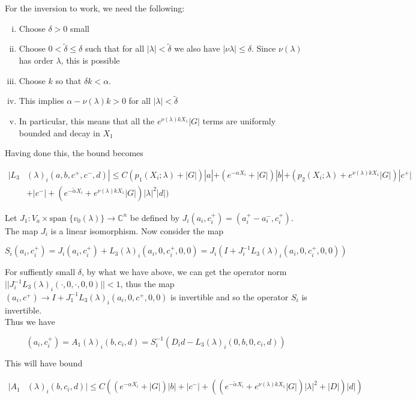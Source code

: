 \documentclass[12pt]{article}
\def\C{{\mathbb C}}
\begin{document}
\begin{enumerate}
For the inversion to work, we need the following:

\begin{enumerate}[(i)]
\item Choose $\delta > 0$ small
\item Choose $0 < \tilde{\delta} \leq \delta$ such that for all $|\lambda| < \tilde{\delta}$ we also have $|\nu{\lambda}| \leq \delta$. Since $\nu(\lambda)$ has order $\lambda$, this is possible
\item Choose $k$ so that $\delta k < \alpha$. 
\item This implies $\alpha - \nu(\lambda) k > 0$ for all $|\lambda| < \tilde{\delta}$
\item In particular, this means that all the $e^{\nu(\lambda)k X_1} |G|$ terms are uniformly bounded and decay in $X_1$
\end{enumerate}

Having done this, the bound becomes

\begin{align*}
|L_3&(\lambda)_i(a, b, c^+, c^-, d)| \leq C (p_1(X_i; \lambda) + |G|)|a| + (e^{-\alpha X_i} + |G|) |b| + ( p_2(X_i; \lambda) + e^{\nu(\lambda) k X_1 } |G|) |c^+| \\
&+ |c^-| + (e^{-\tilde{\alpha} X_i} + e^{\nu(\lambda)k X_1} |G|) |\lambda|^2 |d| )
\end{align*}

Let $J_1: V_a \times \text{span }\{v_0(\lambda)\} \rightarrow \C^n$ be defined by $J_i(a_i, c_i^+) = (a_i^+ - a_i^-, c_i^+)$. The map $J_i$ is a linear isomorphism. Now consider the map

\[
S_i(a_i, c_i^+) = J_i (a_i, c_i^+) + L_3(\lambda)_i(a_i, 0, c_i^+, 0, 0) = J_i( I + J_i^{-1} L_3(\lambda)_i(a_i, 0, c_i^+, 0, 0))
\]


For suffiently small $\delta$, by what we have above, we can get the operator norm $||J_i^{-1} L_3(\lambda)_i(\cdot, 0, \cdot, 0, 0)|| < 1$, thus the map $(a_i, c^+) \rightarrow I + J_1^{-1} L_3(\lambda)_i(a_i, 0, c^+, 0, 0)$ is invertible and so the operator $S_i$ is invertible.\\

Thus we have

\[
(a_i, c_i^+) = A_1(\lambda)_i(b, c_i, d) = S_i^{-1}(D_i d - L_3(\lambda)_i(0, b, 0, c_i, d))
\]

This will have bound

\begin{align*}
|A_1&(\lambda)_i(b, c_i, d)| \leq C ((e^{-\alpha X_i} + |G|) |b| + |c^-| + ((e^{-\tilde{\alpha} X_i} + e^{\nu(\lambda)k X_1} |G|) |\lambda|^2 + |D|) |d| )
\end{align*}


\end{enumerate}
\end{document}
